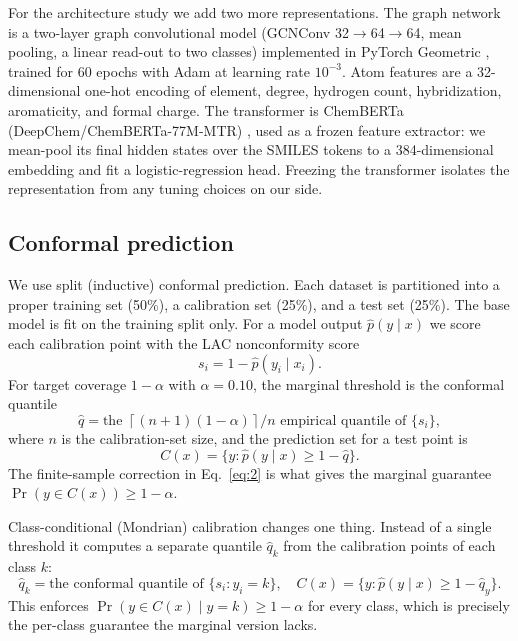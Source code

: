 \documentclass[11pt]{article}
\begin{document}
For the architecture study we add two more representations. The graph network is a two-layer graph
convolutional model \cite{kipf2017} (GCNConv 32$\to$64$\to$64, mean pooling, a linear read-out to
two classes) implemented in PyTorch Geometric \cite{fey2019}, trained for 60 epochs with Adam at
learning rate $10^{-3}$. Atom features are a 32-dimensional one-hot encoding of element, degree,
hydrogen count, hybridization, aromaticity, and formal charge. The transformer is ChemBERTa
(DeepChem/ChemBERTa-77M-MTR) \cite{chithrananda2020}, used as a frozen feature extractor: we
mean-pool its final hidden states over the SMILES tokens to a 384-dimensional embedding and fit a
logistic-regression head. Freezing the transformer isolates the representation from any tuning
choices on our side.

\subsection{Conformal prediction}

We use split (inductive) conformal prediction. Each dataset is partitioned into a proper training
set (50\%), a calibration set (25\%), and a test set (25\%). The base model is fit on the training
split only. For a model output $\hat p(y\mid x)$ we score each calibration point with the LAC
nonconformity score \cite{sadinle2019}
\begin{equation}
s_i = 1 - \hat p(y_i \mid x_i). \label{eq:1}
\end{equation}
For target coverage $1-\alpha$ with $\alpha=0.10$, the marginal threshold is the conformal quantile
\begin{equation}
\hat q = \text{the } \left\lceil (n+1)(1-\alpha) \right\rceil / n \text{ empirical quantile of } \{s_i\}, \label{eq:2}
\end{equation}
where $n$ is the calibration-set size, and the prediction set for a test point is
\begin{equation}
C(x) = \{ y : \hat p(y\mid x) \ge 1-\hat q \}. \label{eq:3}
\end{equation}
The finite-sample correction in Eq.~\ref{eq:2} is what gives the marginal guarantee
$\Pr(y\in C(x)) \ge 1-\alpha$.

Class-conditional (Mondrian) calibration changes one thing. Instead of a single threshold it
computes a separate quantile $\hat q_k$ from the calibration points of each class $k$:
\begin{equation}
\hat q_k = \text{the conformal quantile of } \{s_i : y_i = k\}, \quad
C(x) = \{ y : \hat p(y\mid x) \ge 1-\hat q_y \}. \label{eq:4}
\end{equation}
This enforces $\Pr(y\in C(x)\mid y=k) \ge 1-\alpha$ for every class, which is precisely the
per-class guarantee the marginal version lacks.
\end{document}
